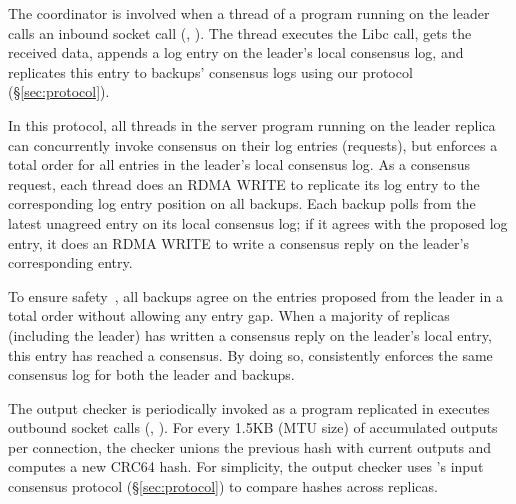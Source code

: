 The coordinator is involved when a thread of a program running on the \xxx 
leader calls an inbound socket call (\eg, \recv). The thread executes the 
Libc call, gets the received data, appends a log entry on the leader's local 
consensus log, and replicates this entry to backups' consensus logs using our 
\paxos protocol (\S\ref{sec:protocol}).

In this protocol, all threads in the server program running on the leader 
replica can concurrently invoke consensus on their log entries (requests), but 
\xxx enforces a total order for all entries in the leader's local consensus 
log. As a consensus request, each thread does an RDMA WRITE to replicate its 
log entry to the corresponding log entry position on all \xxx backups. Each 
\xxx backup polls from the latest unagreed entry on its local consensus log; 
if it agrees with the proposed log entry, it does an RDMA WRITE to write a 
consensus reply on the leader's corresponding entry.

To ensure \paxos safety~\cite{paxos:practical}, all \xxx backups agree on the 
entries proposed from the leader in a total order without allowing any entry 
gap. When a majority of replicas (including the leader) has written a consensus 
reply on the leader's local entry, this entry has reached a consensus. By doing 
so, \xxx consistently enforces the same consensus log for both the leader and
backups.

The output checker is periodically invoked as a program replicated in \xxx 
executes outbound socket calls (\eg, \send). For every 1.5KB (MTU size) of 
accumulated outputs per connection, the checker unions the previous hash with 
current outputs and computes a new CRC64 hash. For simplicity, the output 
checker uses \xxx's input consensus protocol (\S\ref{sec:protocol}) to compare 
hashes across replicas.
